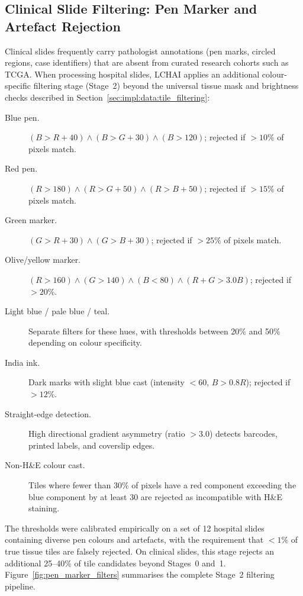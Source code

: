 \subsection{Clinical Slide Filtering: Pen Marker and Artefact Rejection}
\label{sec:impl:lchai:pen_filters}

Clinical slides frequently carry pathologist annotations (pen marks,
circled regions, case identifiers) that are absent from curated
research cohorts such as TCGA.
When processing hospital slides, LCHAI applies an additional
colour-specific filtering stage (Stage~2) beyond the universal
tissue mask and brightness checks described in
Section~\ref{sec:impl:data:tile_filtering}:

\begin{description}
    \item[Blue pen.]
    $(B > R + 40) \wedge (B > G + 30) \wedge (B > 120)$; rejected if
    $> 10\%$ of pixels match.

    \item[Red pen.]
    $(R > 180) \wedge (R > G + 50) \wedge (R > B + 50)$; rejected if
    $> 15\%$ of pixels match.

    \item[Green marker.]
    $(G > R + 30) \wedge (G > B + 30)$; rejected if $> 25\%$ of
    pixels match.

    \item[Olive/yellow marker.]
    $(R > 160) \wedge (G > 140) \wedge (B < 80) \wedge
    (R + G > 3.0B)$; rejected if $> 20\%$.

    \item[Light blue / pale blue / teal.]
    Separate filters for these hues, with thresholds between 20\% and
    50\% depending on colour specificity.

    \item[India ink.]
    Dark marks with slight blue cast (intensity $< 60$, $B > 0.8R$);
    rejected if $> 12\%$.

    \item[Straight-edge detection.]
    High directional gradient asymmetry (ratio $> 3.0$) detects
    barcodes, printed labels, and coverslip edges.

    \item[Non-H\&E colour cast.]
    Tiles where fewer than 30\% of pixels have a red component
    exceeding the blue component by at least 30 are rejected as
    incompatible with H\&E staining.
\end{description}

The thresholds were calibrated empirically on a set of 12 hospital
slides containing diverse pen colours and artefacts, with the
requirement that $< 1\%$ of true tissue tiles are falsely rejected.
On clinical slides, this stage rejects an additional 25--40\% of
tile candidates beyond Stages~0 and~1.
Figure~\ref{fig:pen_marker_filters} summarises the complete Stage~2
filtering pipeline.


